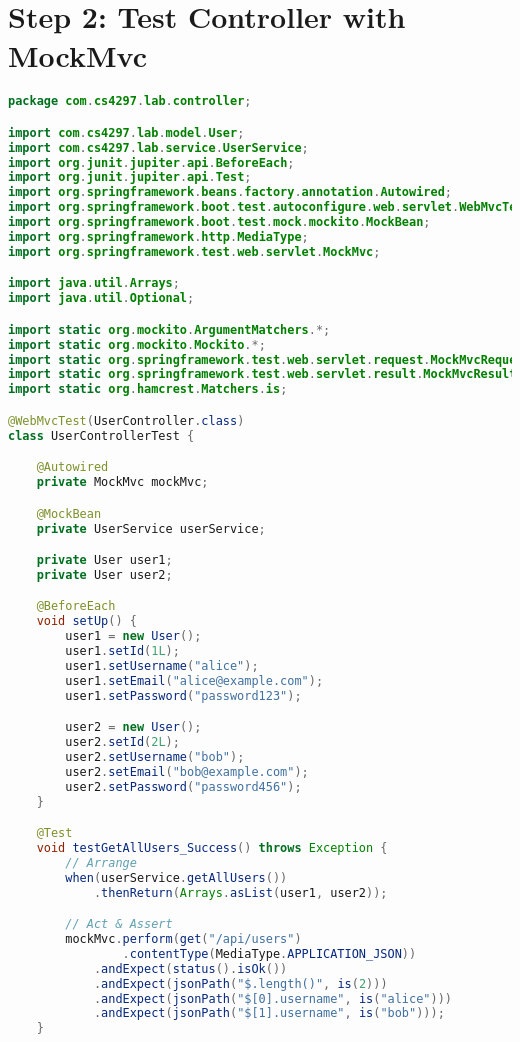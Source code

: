 \documentclass[12pt,a4paper]{article}
\begin{document}
\section{Step 2: Test Controller with MockMvc}

\begin{lstlisting}[language=java, caption=UserControllerTest.java - Controller Layer Tests]
package com.cs4297.lab.controller;

import com.cs4297.lab.model.User;
import com.cs4297.lab.service.UserService;
import org.junit.jupiter.api.BeforeEach;
import org.junit.jupiter.api.Test;
import org.springframework.beans.factory.annotation.Autowired;
import org.springframework.boot.test.autoconfigure.web.servlet.WebMvcTest;
import org.springframework.boot.test.mock.mockito.MockBean;
import org.springframework.http.MediaType;
import org.springframework.test.web.servlet.MockMvc;

import java.util.Arrays;
import java.util.Optional;

import static org.mockito.ArgumentMatchers.*;
import static org.mockito.Mockito.*;
import static org.springframework.test.web.servlet.request.MockMvcRequestBuilders.*;
import static org.springframework.test.web.servlet.result.MockMvcResultMatchers.*;
import static org.hamcrest.Matchers.is;

@WebMvcTest(UserController.class)
class UserControllerTest {

    @Autowired
    private MockMvc mockMvc;

    @MockBean
    private UserService userService;

    private User user1;
    private User user2;

    @BeforeEach
    void setUp() {
        user1 = new User();
        user1.setId(1L);
        user1.setUsername("alice");
        user1.setEmail("alice@example.com");
        user1.setPassword("password123");

        user2 = new User();
        user2.setId(2L);
        user2.setUsername("bob");
        user2.setEmail("bob@example.com");
        user2.setPassword("password456");
    }

    @Test
    void testGetAllUsers_Success() throws Exception {
        // Arrange
        when(userService.getAllUsers())
            .thenReturn(Arrays.asList(user1, user2));

        // Act & Assert
        mockMvc.perform(get("/api/users")
                .contentType(MediaType.APPLICATION_JSON))
            .andExpect(status().isOk())
            .andExpect(jsonPath("$.length()", is(2)))
            .andExpect(jsonPath("$[0].username", is("alice")))
            .andExpect(jsonPath("$[1].username", is("bob")));
    }


\end{lstlisting}
\end{document}
